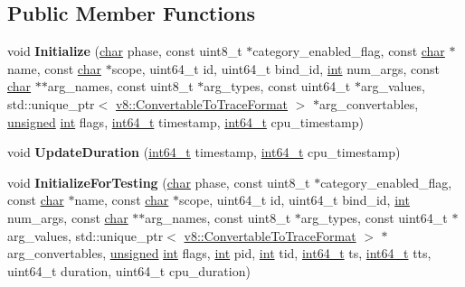 \subsection*{Public Member Functions}
\begin{DoxyCompactItemize}
\item 
\mbox{\label{classv8_1_1platform_1_1tracing_1_1TraceObject_aaa2b2f4c50e28cd65d2146cbf84f1449}} 
void {\bfseries Initialize} (\mbox{\hyperlink{classchar}{char}} phase, const uint8\+\_\+t $\ast$category\+\_\+enabled\+\_\+flag, const \mbox{\hyperlink{classchar}{char}} $\ast$name, const \mbox{\hyperlink{classchar}{char}} $\ast$scope, uint64\+\_\+t id, uint64\+\_\+t bind\+\_\+id, \mbox{\hyperlink{classint}{int}} num\+\_\+args, const \mbox{\hyperlink{classchar}{char}} $\ast$$\ast$arg\+\_\+names, const uint8\+\_\+t $\ast$arg\+\_\+types, const uint64\+\_\+t $\ast$arg\+\_\+values, std\+::unique\+\_\+ptr$<$ \mbox{\hyperlink{classv8_1_1ConvertableToTraceFormat}{v8\+::\+Convertable\+To\+Trace\+Format}} $>$ $\ast$arg\+\_\+convertables, \mbox{\hyperlink{classunsigned}{unsigned}} \mbox{\hyperlink{classint}{int}} flags, \mbox{\hyperlink{classint64__t}{int64\+\_\+t}} timestamp, \mbox{\hyperlink{classint64__t}{int64\+\_\+t}} cpu\+\_\+timestamp)
\item 
\mbox{\label{classv8_1_1platform_1_1tracing_1_1TraceObject_ac7bc3b2b76c56a0c3ac7911ce36174cd}} 
void {\bfseries Update\+Duration} (\mbox{\hyperlink{classint64__t}{int64\+\_\+t}} timestamp, \mbox{\hyperlink{classint64__t}{int64\+\_\+t}} cpu\+\_\+timestamp)
\item 
\mbox{\label{classv8_1_1platform_1_1tracing_1_1TraceObject_ac72dae1918276021f3c747ef2056b710}} 
void {\bfseries Initialize\+For\+Testing} (\mbox{\hyperlink{classchar}{char}} phase, const uint8\+\_\+t $\ast$category\+\_\+enabled\+\_\+flag, const \mbox{\hyperlink{classchar}{char}} $\ast$name, const \mbox{\hyperlink{classchar}{char}} $\ast$scope, uint64\+\_\+t id, uint64\+\_\+t bind\+\_\+id, \mbox{\hyperlink{classint}{int}} num\+\_\+args, const \mbox{\hyperlink{classchar}{char}} $\ast$$\ast$arg\+\_\+names, const uint8\+\_\+t $\ast$arg\+\_\+types, const uint64\+\_\+t $\ast$arg\+\_\+values, std\+::unique\+\_\+ptr$<$ \mbox{\hyperlink{classv8_1_1ConvertableToTraceFormat}{v8\+::\+Convertable\+To\+Trace\+Format}} $>$ $\ast$arg\+\_\+convertables, \mbox{\hyperlink{classunsigned}{unsigned}} \mbox{\hyperlink{classint}{int}} flags, \mbox{\hyperlink{classint}{int}} pid, \mbox{\hyperlink{classint}{int}} tid, \mbox{\hyperlink{classint64__t}{int64\+\_\+t}} ts, \mbox{\hyperlink{classint64__t}{int64\+\_\+t}} tts, uint64\+\_\+t duration, uint64\+\_\+t cpu\+\_\+duration)

\end{DoxyCompactItemize}
